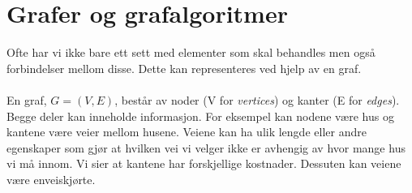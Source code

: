 \section{Grafer og grafalgoritmer}
Ofte har vi ikke bare ett sett med elementer som skal behandles men også forbindelser mellom disse. Dette kan representeres ved hjelp av en graf.
\\\\
En graf, $G = (V,E)$, består av noder (V for \textit{vertices}) og kanter (E for \textit{edges}). Begge deler kan inneholde informasjon. For eksempel kan nodene være hus og kantene være veier mellom husene. Veiene kan ha ulik lengde eller andre egenskaper som gjør at hvilken vei vi velger ikke er avhengig av hvor mange hus vi må innom. Vi sier at kantene har forskjellige kostnader. Dessuten kan veiene være enveiskjørte.

